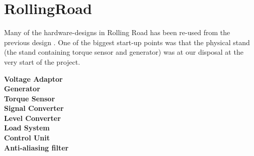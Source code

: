 \section{RollingRoad}
Many of the hardware-designs in Rolling Road has been re-used from the previous design . One of the biggest start-up points was that the physical stand (the stand containing torque sensor and generator) was at our disposal at the very start of the project.

\textbf{Voltage Adaptor}\\

\textbf{Generator}\\

\textbf{Torque Sensor}\\

\textbf{Signal Converter}\\

\textbf{Level Converter}\\

\textbf{Load System}\\

\textbf{Control Unit}\\

\textbf{Anti-aliasing filter}\\